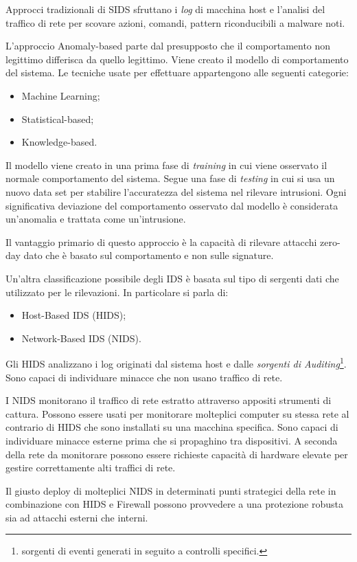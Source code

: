 Approcci tradizionali di SIDS sfruttano i \textit{log} di macchina host e l'analisi del traffico di rete per scovare azioni, comandi, pattern riconducibili a malware noti.


L'approccio Anomaly-based parte dal presupposto che il comportamento non legittimo differisca da quello legittimo.
Viene creato il modello di comportamento del sistema. Le tecniche usate per effettuare appartengono alle seguenti categorie:
\begin{itemize}
    \item Machine Learning;
    \item Statistical-based;
    \item Knowledge-based.
\end{itemize}
Il modello viene creato in una prima fase di \textit{training} in cui viene osservato il normale comportamento del sistema. Segue una fase di \textit{testing} in cui si usa un nuovo data set per stabilire l'accuratezza del sistema nel rilevare intrusioni. 
Ogni significativa deviazione del comportamento osservato dal modello è considerata un'anomalia e trattata come un'intrusione.

Il vantaggio primario di questo approccio è la capacità di rilevare attacchi zero-day dato che è basato sul comportamento e non sulle signature.


Un'altra classificazione possibile degli IDS è basata sul tipo di sergenti dati che utilizzato per le rilevazioni.  In particolare si parla di:
\begin{itemize}
    \item Host-Based IDS (HIDS);
    \item Network-Based IDS (NIDS).
\end{itemize}

Gli HIDS analizzano i log originati dal sistema host e dalle \textit{sorgenti di Auditing}\footnote{sorgenti di eventi generati in seguito a controlli specifici.}. Sono capaci di individuare minacce che non usano traffico di rete.

I NIDS monitorano il traffico di rete estratto attraverso appositi strumenti di cattura. Possono essere usati per monitorare molteplici computer su stessa rete al contrario di HIDS che sono installati su una macchina specifica. Sono capaci di individuare minacce esterne prima che si propaghino tra dispositivi. A seconda della rete da monitorare possono essere richieste capacità di hardware elevate per gestire correttamente alti traffici di rete.


Il giusto deploy di molteplici NIDS in determinati punti strategici della rete in combinazione con HIDS e Firewall possono provvedere a una  protezione robusta sia ad attacchi esterni che interni.

